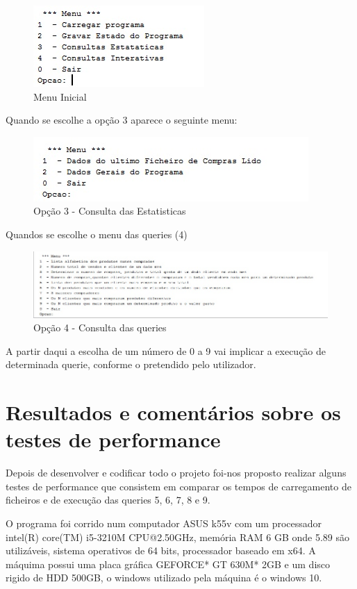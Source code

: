 	
\begin{figure}[h!]
	\includegraphics[scale=1.5]{MenuInicial.jpg}  
	\caption{Menu Inicial }  
\end{figure}

Quando se escolhe a opção 3 aparece o seguinte menu: 
\begin{figure}[h!]
	\includegraphics[scale=1]{ConsultasEstatisticas.jpg}  
	\caption{Opção 3 - Consulta das Estatisticas }  
\end{figure}

Quandos se escolhe o menu das queries (4) 
\begin{figure}[h!]
	\includegraphics[scale=0.9]{ConsultasIterativas}  
	\caption{Opção 4 - Consulta das queries }  
\end{figure}

A partir daqui a escolha de um número de 0 a 9 vai implicar a execução de determinada querie, conforme o pretendido pelo utilizador. 

\chapter{Resultados e comentários sobre os testes de performance}

Depois de desenvolver e codificar todo o projeto foi-nos proposto realizar alguns testes de performance que consistem em comparar os tempos de carregamento de ficheiros e de execução das queries 5, 6, 7, 8 e 9.

O programa foi corrido num computador ASUS k55v com um processador intel(R) core(TM) i5-3210M CPU@2.50GHz, memória RAM 6 GB onde 5.89 são utilizáveis, sistema operativos de 64 bits, processador baseado em x64. A máquima possui uma placa gráfica GEFORCE* GT 630M* 2GB e um disco rigido de HDD 500GB, o windows utilizado pela máquina é o windows 10. 

